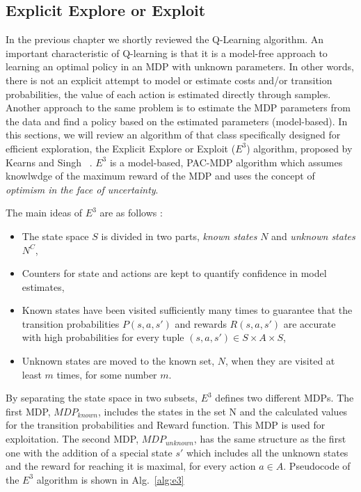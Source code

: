 \subsection{Explicit Explore or Exploit}
In the previous chapter we shortly reviewed the Q-Learning algorithm. An important characteristic of Q-learning is that it is a model-free approach to learning an optimal policy in an MDP with unknown parameters. In other words, there is not an explicit attempt to model or estimate costs and/or transition probabilities, the value of each action is estimated directly through samples. Another approach to the same problem is to estimate the MDP parameters from the data and find a policy based on the estimated parameters (model-based). In this sections, we will review an algorithm of that class specifically designed for efficient exploration, the Explicit Explore or Exploit ($E^3$) algorithm, proposed by Kearns and Singh ~\cite{Kearns:2002:NRL:599616.599699}. $E^3$ is a model-based, PAC-MDP algorithm which assumes knowlwdge of the maximum reward of the MDP and uses the concept of \emph{optimism in the face of uncertainty}.\par 
The main ideas of $E^3$ are as follows :
\begin{itemize}
	\item The state space $S$ is divided in two parts, \emph{known states} $N$ and \emph{unknown states} $N^C$,
	\item Counters for state and actions are kept to quantify confidence in model estimates,
	\item Known states have been visited sufficiently many times to guarantee that the transition probabilities $P(s,a,s')$ and rewards $R(s,a,s')$ are accurate with high probabilities for every tuple $(s,a,s') \in S \times A \times S$,
	\item Unknown states are moved to the known set, $N$, when they are visited at least $m$ times, for some number $m$.
\end{itemize}
By separating the state space in two subsets, $E^3$ defines two different MDPs. The first MDP, $MDP_{known}$, includes the states in the set N and the calculated values for the transition probabilities and Reward function. This MDP is used for exploitation. The second MDP, $MDP_{unknown}$, has the same structure as the first one with the addition of a special state $s'$ which includes all the unknown states and the reward for reaching it is maximal, for every action $a \in A$. Pseudocode of the $E^3$ algorithm is shown in Alg.~\ref{alg:e3}

